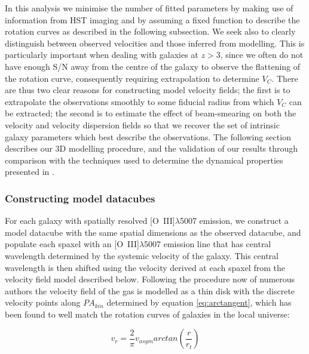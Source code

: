\documentclass[fleqn,usenatbib]{mn2e}
\begin{document}
In this analysis we minimise the number of fitted parameters by making use of information from HST imaging and by assuming a fixed function to describe the rotation curves as described in the following subsection.    
We seek also to clearly distinguish between observed velocities and those inferred from modelling.
This is particularly important when dealing with galaxies at $z > 3$, since we often do not have enough S/N away from the centre of the galaxy to observe the flattening of the rotation curve, consequently requiring extrapolation to determine $V_{C}$.  
There are thus two clear reasons for constructing model velocity fields; the first is to extrapolate the observations smoothly to some fiducial radius from which $V_{C}$ can be extracted; the second is to estimate the effect of beam-smearing on both the velocity and velocity dispersion fields so that we recover the set of intrinsic galaxy parameters which best describe the observations.
The following section describes our 3D modelling procedure, and the validation of our results through comparison with the techniques used to determine the dynamical properties presented in \cite{Harrison2017}.

\subsubsection{Constructing model datacubes}\label{subsubec:model_cube}
For each galaxy with spatially resolved [O~{\sc III}]$\lambda$5007 emission, we construct a model datacube with the same spatial dimensions as the observed datacube, and populate each spaxel with an [O~{\sc III}]$\lambda$5007 emission line that has central wavelength determined by the systemic velocity of the galaxy.
This central wavelength is then shifted using the velocity derived at each spaxel from the velocity field model described below.  
Following the procedure now of numerous authors \citep[e.g.][]{Epinat2010,Epinat2012,Swinbank2012,Stott2016,Mason2016} the velocity field of the gas is modelled as a thin disk with the discrete velocity points along $PA_{kin}$ determined by equation \ref{eq:arctangent}, which has been found to well match the rotation curves of galaxies in the local universe:

\begin{equation}\label{eq:arctangent}
   v_{r} = \frac{2}{\pi}v_{asym}arctan\left(\frac{r}{r_{t}}\right)
\end{equation}
\end{document}
